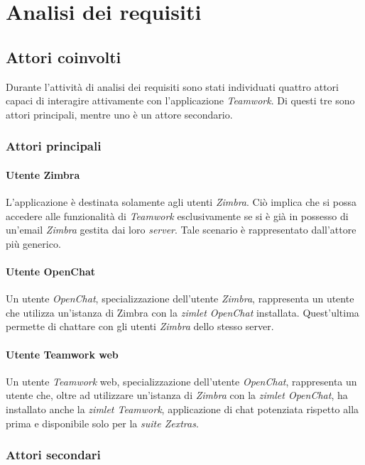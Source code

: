 
\chapter{Analisi dei requisiti}\label{chap:requirements}

\section{Attori coinvolti}
Durante l'attività di analisi dei requisiti sono stati individuati quattro 
attori capaci di interagire attivamente con l'applicazione \emph{Teamwork}. 
Di questi tre sono attori principali, mentre uno è un attore secondario.
\subsection{Attori principali}
\subsubsection{Utente Zimbra}
L'applicazione è destinata solamente agli utenti \emph{Zimbra}. Ciò implica che
si possa accedere alle funzionalità di \emph{Teamwork} esclusivamente se si è
già in possesso di un'email \emph{Zimbra} gestita dai loro \emph{server}. Tale
scenario è rappresentato dall'attore più generico.
\subsubsection{Utente OpenChat}
Un utente \emph{OpenChat}, specializzazione dell'utente \emph{Zimbra}, rappresenta un utente che utilizza un'istanza di Zimbra con la \emph{zimlet OpenChat} installata. Quest'ultima permette di chattare con gli utenti \emph{Zimbra} dello stesso server.

\subsubsection{Utente Teamwork web}
Un utente \emph{Teamwork} web, specializzazione dell'utente \emph{OpenChat}, rappresenta 
un utente che, oltre ad utilizzare un'istanza di \emph{Zimbra} con la \emph{zimlet OpenChat}, 
ha installato anche la \emph{zimlet Teamwork}, applicazione di chat potenziata rispetto 
alla prima e disponibile solo per la \emph{suite Zextras}.

\subsection{Attori secondari}
